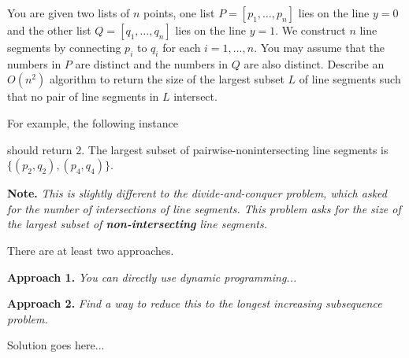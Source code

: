 \documentclass{article}
\begin{document}
\begin{question}
You are given two lists of $n$ points, one list $P = [p_1, \dots, p_n]$ lies on the line $y = 0$ and the other list $Q = [q_1, \dots, q_n]$ lies on the line $y = 1$. We construct $n$ line segments by connecting $p_i$ to $q_i$ for each $i = 1, \dots, n$. You may assume that the numbers in $P$ are distinct and the numbers in $Q$ are also distinct. Describe an $O(n^2)$ algorithm to return the size of the largest subset $L$ of line segments such that no pair of line segments in $L$ intersect.

For example, the following instance
\begin{center}
\end{center}
should return 2. The largest subset of pairwise-nonintersecting line segments is $\{(p_2, q_2), (p_4, q_4)\}$.

{\bfseries Note.} {\em This is slightly different to the divide-and-conquer problem, which asked for the number of intersections of line segments. This problem asks for the size of the largest subset of {\bfseries non-intersecting} line segments.}

There are at least two approaches.

{\bfseries Approach 1.} {\em You can directly use dynamic programming...}

{\bfseries Approach 2.} {\em Find a way to reduce this to the longest increasing subsequence problem.}
\end{question}

\begin{solution}
Solution goes here...
\end{solution}
\end{document}
